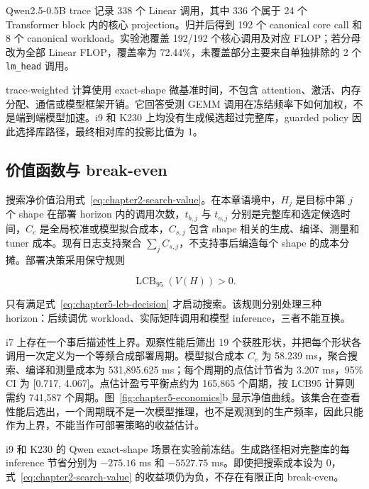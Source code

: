 Qwen2.5-0.5B trace 记录 338 个 Linear 调用，其中 336 个属于 24 个 Transformer block 内的核心 projection。归并后得到 192 个 canonical core call 和 8 个 canonical workload。实验池覆盖 192/192 个核心调用及对应 FLOP；若分母改为全部 Linear FLOP，覆盖率为 72.44\%，未覆盖部分主要来自单独排除的 2 个 \texttt{lm\_head} 调用。

trace-weighted 计算使用 exact-shape 微基准时间，不包含 attention、激活、内存分配、通信或模型框架开销。它回答受测 GEMM 调用在冻结频率下如何加权，不是端到端模型加速。i9 和 K230 上均没有生成候选超过完整库，guarded policy 因此选择库路径，最终相对库的投影比值为 1。

\subsection{价值函数与 break-even}

搜索净价值沿用式~\eqref{eq:chapter2-search-value}。在本章语境中，$H_j$ 是目标中第 $j$ 个 shape 在部署 horizon 内的调用次数，$t_{b,j}$ 与 $t_{o,j}$ 分别是完整库和选定候选时间，$C_c$ 是全局校准或模型拟合成本，$C_{s,j}$ 包含 shape 相关的生成、编译、测量和 tuner 成本。现有日志支持聚合 $\sum_j C_{s,j}$，不支持事后编造每个 shape 的成本分摊。部署决策采用保守规则

\begin{equation}
\operatorname{LCB}_{95}\!\left(V(H)\right)>0.
\label{eq:chapter5-lcb-decision}
\end{equation}

只有满足式~\eqref{eq:chapter5-lcb-decision} 才启动搜索。该规则分别处理三种 horizon：后续调优 workload、实际矩阵调用和模型 inference，三者不能互换。

i7 上存在一个事后描述性上界。观察性能后筛出 19 个获胜形状，并把每个形状各调用一次定义为一个等频合成部署周期。模型拟合成本 $C_c$ 为 58.239 ms，聚合搜索、编译和测量成本为 531,895.625 ms；每个周期的点估计节省为 3.207 ms，95\% CI 为 [0.717, 4.067]。点估计盈亏平衡点约为 165,865 个周期，按 LCB95 计算则需约 741,587 个周期。图~\ref{fig:chapter5-economics}b 显示净值曲线。该集合在查看性能后选出，一个周期既不是一次模型推理，也不是观测到的生产频率，因此只能作为上界，不能当作可部署策略的收益估计。

i9 和 K230 的 Qwen exact-shape 场景在实验前冻结。生成路径相对完整库的每 inference 节省分别为 $-275.16$ ms 和 $-5527.75$ ms。即使把搜索成本设为 0，式~\eqref{eq:chapter2-search-value} 的收益项仍为负，不存在有限正向 break-even。

